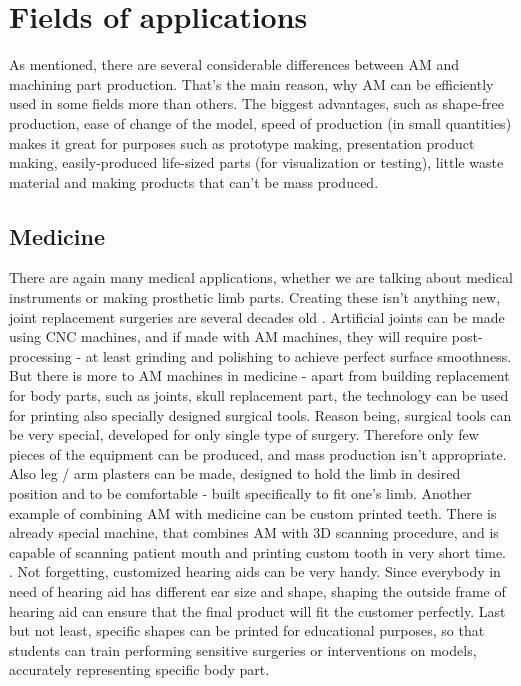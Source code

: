 \documentclass[a4paper]{report}
\begin{document}
\section{Fields of applications}
As mentioned, there are several considerable differences between AM and machining part production. That's the main reason, why AM can be efficiently used in some fields more than others. The biggest advantages, such as shape-free production, ease of change of the model, speed of production (in small quantities) makes it great for purposes such as prototype making, presentation product making, easily-produced life-sized parts (for visualization or testing), little waste material and making products that can't be mass produced.\\
\subsection{Medicine}
There are again many medical applications, whether we are talking about medical instruments or making prosthetic limb parts. Creating these isn't anything new, joint replacement surgeries are several decades old . Artificial joints can be made using CNC machines, and if made with AM machines, they will require post-processing - at least grinding and polishing to achieve perfect surface smoothness.\\
But there is more to AM machines in medicine - apart from building replacement for body parts, such as joints, skull replacement part, the technology can be used for printing also specially designed surgical tools. Reason being, surgical tools can be very special, developed for only single type of surgery. Therefore only few pieces of the equipment can be produced, and mass production isn't appropriate. 
Also leg / arm plasters can be made, designed to hold the limb in desired position and to be comfortable - built specifically to fit one's limb. Another example of combining AM with medicine can be custom printed teeth. There is already special machine, that combines AM with 3D scanning procedure, and is capable of scanning patient mouth and printing custom tooth in very short time. . Not forgetting, customized hearing aids can be very handy. Since everybody in need of hearing aid has different ear size and shape, shaping the outside frame of hearing aid can ensure that the final product will fit the customer perfectly. Last but not least, specific shapes can be printed for educational purposes, so that students can train performing sensitive  surgeries or interventions on models, accurately representing specific body part.
\end{document}
